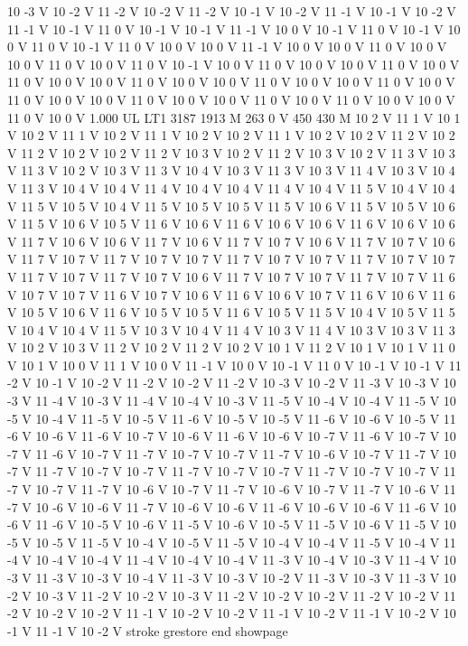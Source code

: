 {10 -3 V
10 -2 V
11 -2 V
10 -2 V
11 -2 V
10 -1 V
10 -2 V
11 -1 V
10 -1 V
10 -2 V
11 -1 V
10 -1 V
11 0 V
10 -1 V
10 -1 V
11 -1 V
10 0 V
10 -1 V
11 0 V
10 -1 V
10 0 V
11 0 V
10 -1 V
11 0 V
10 0 V
10 0 V
11 -1 V
10 0 V
10 0 V
11 0 V
10 0 V
10 0 V
11 0 V
10 0 V
11 0 V
10 -1 V
10 0 V
11 0 V
10 0 V
10 0 V
11 0 V
10 0 V
11 0 V
10 0 V
10 0 V
11 0 V
10 0 V
10 0 V
11 0 V
10 0 V
10 0 V
11 0 V
10 0 V
11 0 V
10 0 V
10 0 V
11 0 V
10 0 V
10 0 V
11 0 V
10 0 V
11 0 V
10 0 V
10 0 V
11 0 V
10 0 V
1.000 UL
LT1
3187 1913 M
263 0 V
450 430 M
10 2 V
11 1 V
10 1 V
10 2 V
11 1 V
10 2 V
11 1 V
10 2 V
10 2 V
11 1 V
10 2 V
10 2 V
11 2 V
10 2 V
11 2 V
10 2 V
10 2 V
11 2 V
10 3 V
10 2 V
11 2 V
10 3 V
10 2 V
11 3 V
10 3 V
11 3 V
10 2 V
10 3 V
11 3 V
10 4 V
10 3 V
11 3 V
10 3 V
11 4 V
10 3 V
10 4 V
11 3 V
10 4 V
10 4 V
11 4 V
10 4 V
10 4 V
11 4 V
10 4 V
11 5 V
10 4 V
10 4 V
11 5 V
10 5 V
10 4 V
11 5 V
10 5 V
10 5 V
11 5 V
10 6 V
11 5 V
10 5 V
10 6 V
11 5 V
10 6 V
10 5 V
11 6 V
10 6 V
11 6 V
10 6 V
10 6 V
11 6 V
10 6 V
10 6 V
11 7 V
10 6 V
10 6 V
11 7 V
10 6 V
11 7 V
10 7 V
10 6 V
11 7 V
10 7 V
10 6 V
11 7 V
10 7 V
11 7 V
10 7 V
10 7 V
11 7 V
10 7 V
10 7 V
11 7 V
10 7 V
10 7 V
11 7 V
10 7 V
11 7 V
10 7 V
10 6 V
11 7 V
10 7 V
10 7 V
11 7 V
10 7 V
11 6 V
10 7 V
10 7 V
11 6 V
10 7 V
10 6 V
11 6 V
10 6 V
10 7 V
11 6 V
10 6 V
11 6 V
10 5 V
10 6 V
11 6 V
10 5 V
10 5 V
11 6 V
10 5 V
11 5 V
10 4 V
10 5 V
11 5 V
10 4 V
10 4 V
11 5 V
10 3 V
10 4 V
11 4 V
10 3 V
11 4 V
10 3 V
10 3 V
11 3 V
10 2 V
10 3 V
11 2 V
10 2 V
11 2 V
10 2 V
10 1 V
11 2 V
10 1 V
10 1 V
11 0 V
10 1 V
10 0 V
11 1 V
10 0 V
11 -1 V
10 0 V
10 -1 V
11 0 V
10 -1 V
10 -1 V
11 -2 V
10 -1 V
10 -2 V
11 -2 V
10 -2 V
11 -2 V
10 -3 V
10 -2 V
11 -3 V
10 -3 V
10 -3 V
11 -4 V
10 -3 V
11 -4 V
10 -4 V
10 -3 V
11 -5 V
10 -4 V
10 -4 V
11 -5 V
10 -5 V
10 -4 V
11 -5 V
10 -5 V
11 -6 V
10 -5 V
10 -5 V
11 -6 V
10 -6 V
10 -5 V
11 -6 V
10 -6 V
11 -6 V
10 -7 V
10 -6 V
11 -6 V
10 -6 V
10 -7 V
11 -6 V
10 -7 V
10 -7 V
11 -6 V
10 -7 V
11 -7 V
10 -7 V
10 -7 V
11 -7 V
10 -6 V
10 -7 V
11 -7 V
10 -7 V
11 -7 V
10 -7 V
10 -7 V
11 -7 V
10 -7 V
10 -7 V
11 -7 V
10 -7 V
10 -7 V
11 -7 V
10 -7 V
11 -7 V
10 -6 V
10 -7 V
11 -7 V
10 -6 V
10 -7 V
11 -7 V
10 -6 V
11 -7 V
10 -6 V
10 -6 V
11 -7 V
10 -6 V
10 -6 V
11 -6 V
10 -6 V
10 -6 V
11 -6 V
10 -6 V
11 -6 V
10 -5 V
10 -6 V
11 -5 V
10 -6 V
10 -5 V
11 -5 V
10 -6 V
11 -5 V
10 -5 V
10 -5 V
11 -5 V
10 -4 V
10 -5 V
11 -5 V
10 -4 V
10 -4 V
11 -5 V
10 -4 V
11 -4 V
10 -4 V
10 -4 V
11 -4 V
10 -4 V
10 -4 V
11 -3 V
10 -4 V
10 -3 V
11 -4 V
10 -3 V
11 -3 V
10 -3 V
10 -4 V
11 -3 V
10 -3 V
10 -2 V
11 -3 V
10 -3 V
11 -3 V
10 -2 V
10 -3 V
11 -2 V
10 -2 V
10 -3 V
11 -2 V
10 -2 V
10 -2 V
11 -2 V
10 -2 V
11 -2 V
10 -2 V
10 -2 V
11 -1 V
10 -2 V
10 -2 V
11 -1 V
10 -2 V
11 -1 V
10 -2 V
10 -1 V
11 -1 V
10 -2 V
stroke
grestore
end
showpage
}
